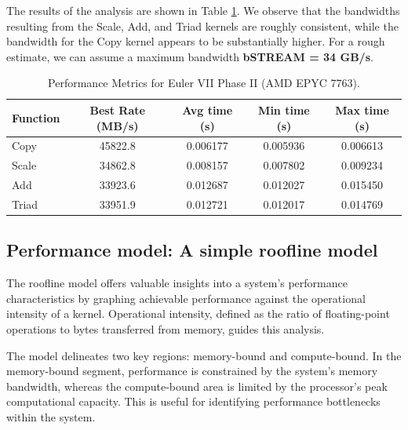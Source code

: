 \documentclass[unicode,11pt,a4paper,oneside,numbers=endperiod,openany]{scrartcl}
\begin{document}
The results of the analysis are shown in Table \ref{tab:performance_II}.
We observe that the bandwidths resulting from the Scale, Add, and Triad kernels are roughly
consistent, while the bandwidth for the Copy kernel appears to be substantially higher. 
For a rough estimate, we can assume a maximum bandwidth \textbf{bSTREAM = 34 GB/s}.
\begin{table}[htbp]
    \centering
    \caption{Performance Metrics for Euler VII Phase II (AMD EPYC 7763).}
    \begin{tabular}{||lcccc||}
        \hline
        Function & Best Rate (MB/s) & Avg time (s) & Min time (s) & Max time (s)\\
        \hline
        \hline
        Copy    & 45822.8 & 0.006177 & 0.005936 & 0.006613 \\
        \hline
        Scale   & 34862.8 & 0.008157 & 0.007802 & 0.009234 \\
        \hline
        Add     & 33923.6 & 0.012687 & 0.012027 & 0.015450 \\
        \hline
        Triad   & 33951.9 & 0.012721 & 0.012017 & 0.014769 \\
        \hline
    \end{tabular}
    \label{tab:performance_II}
\end{table}

\subsection{Performance model: A simple roofline model}
The roofline model offers valuable insights into a system's performance characteristics by graphing achievable
performance against the operational intensity of a kernel. Operational intensity, defined as the
ratio of floating-point operations to bytes transferred from memory, guides this analysis.

The model delineates two key regions: memory-bound and compute-bound. In the memory-bound segment,
performance is constrained by the system's memory bandwidth, whereas the compute-bound area is
limited by the processor's peak computational capacity. This is useful for identifying performance
bottlenecks within the system.
\end{document}
